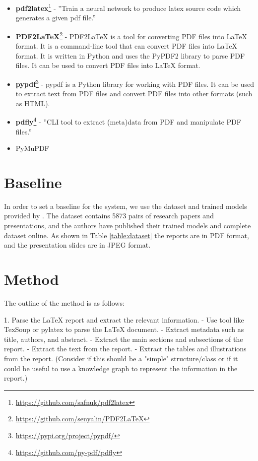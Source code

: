 \begin{itemize}
    \item \textbf{pdf2latex}\footnote{\url{https://github.com/safnuk/pdf2latex}} - ''Train a neural network to produce latex source code which generates a given pdf file.''
    \item \textbf{PDF2LaTeX}\footnote{\url{https://github.com/senyalin/PDF2LaTeX}} - PDF2LaTeX is a tool for converting PDF files into \LaTeX{} format. It is a command-line tool that can convert PDF files into \LaTeX{} format. It is written in Python and uses the PyPDF2 library to parse PDF files. It can be used to convert PDF files into \LaTeX{} format.
    \item \textbf{pypdf}\footnote{\url{https://pypi.org/project/pypdf/}} - pypdf is a Python library for working with PDF files. It can be used to extract text from PDF files and convert PDF files into other formats (such as HTML).
    \item \textbf{pdfly}\footnote{\url{https://github.com/py-pdf/pdfly}} - ''CLI tool to extract (meta)data from PDF and manipulate PDF files.''
    \item PyMuPDF
\end{itemize}

\section{Baseline}
In order to set a baseline for the system, we use the dataset and trained models provided by \citep{Fu:2022:AAAI}. The dataset contains 5873 pairs of research papers and presentations, and the authors have published their trained models and complete dataset online. As shown in Table \ref{table:dataset} the reports are in PDF format, and the presentation slides are in JPEG format. 

\section{Method}
The outline of the method is as follows:

1. Parse the \LaTeX{} report and extract the relevant information.
    - Use tool like TexSoup or pylatex to parse the \LaTeX{} document.
    - Extract metadata such as title, authors, and abstract.
    - Extract the main sections and subsections of the report.
    - Extract the text from the report.
    - Extract the tables and illustrations from the report.
    (Consider if this should be a "simple" structure/class or if it could be useful to use a knowledge graph to represent the information in the report.)

